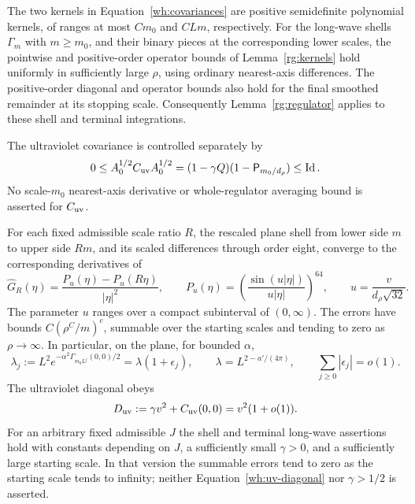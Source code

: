 \begin{lemma}\label{wh:kernels}
The two kernels in Equation~\eqref{wh:covariances} are positive
semidefinite polynomial kernels, of ranges at most $Cm_0$ and
$CLm$, respectively.  For the long-wave shells $\Gamma_m$ with
$m\ge m_0$, and their binary pieces at the corresponding lower
scales, the pointwise and positive-order operator bounds of
Lemma~\ref{rg:kernels} hold uniformly in sufficiently large $\rho$,
using ordinary nearest-axis differences.  The positive-order
diagonal and operator bounds also hold for the final smoothed
remainder at its stopping scale.  Consequently
Lemma~\ref{rg:regulator} applies to these shell and terminal
integrations.

The ultraviolet covariance is controlled separately by
\begin{equation}\label{wh:uv-energy}
 0\le A_0^{1/2}C_{\rm uv}A_0^{1/2}
   =(1-\gamma Q)(1-\mathsf P_{m_0/d_\rho})\le\operatorname{Id}.
\end{equation}
No scale-$m_0$ nearest-axis derivative or whole-regulator
averaging bound is asserted for $C_{\rm uv}$.

For each fixed admissible scale ratio $R$, the rescaled plane
shell from lower side $m$ to upper side $Rm$, and its scaled
differences through order eight, converge to the corresponding
derivatives of
\begin{equation}\label{wh:continuum-symbol}
 \widehat G_R(\eta)=\frac{P_u(\eta)-P_u(R\eta)}{|\eta|^2},
 \qquad
 P_u(\eta)=\left(\frac{\sin(u|\eta|)}{u|\eta|}\right)^{64},
 \qquad u=\frac{v}{d_\rho\sqrt{32}}.
\end{equation}
The parameter $u$ ranges over a compact subinterval of $(0,\infty)$.
The errors have bounds $C(\rho^C/m)^c$, summable over the starting
scales and tending to zero as $\rho\to\infty$.  In particular, on the
plane, for bounded $\alpha$,
\begin{equation}\label{wh:eigenvalue}
 \lambda_j:=L^2e^{-\alpha^2\Gamma_{m_0L^j}(0,0)/2}
  =\lambda(1+\epsilon_j),\qquad
 \lambda=L^{2-a'/(4\pi)},\qquad
 \sum_{j\ge0}|\epsilon_j|=o(1).
\end{equation}
The ultraviolet diagonal obeys
\begin{equation}\label{wh:uv-diagonal}
 D_{\rm uv}:=\gamma v^2+C_{\rm uv}(0,0)=v^2(1+o(1)).
\end{equation}
For an arbitrary fixed admissible $J$ the shell and terminal long-wave assertions hold with
constants depending on $J$, a sufficiently small $\gamma>0$, and a
sufficiently large starting scale.  In that version the summable errors
tend to zero as the starting scale tends to infinity; neither
Equation~\eqref{wh:uv-diagonal} nor $\gamma>1/2$ is asserted.


\end{lemma}
